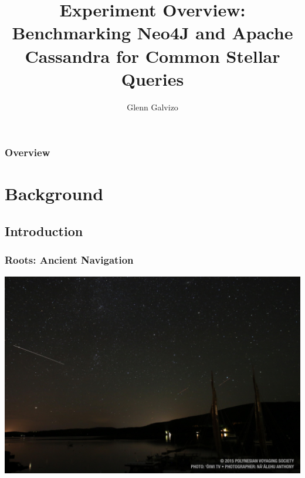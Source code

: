 \documentclass[11pt]{beamer}
\author{Glenn Galvizo}
\title{Experiment Overview: Benchmarking Neo4J and Apache Cassandra for Common Stellar Queries}
\institute{University of Hawaii at Manoa \\ ICS 421}
\begin{document}
    \begin{frame}
        \titlepage
    \end{frame}

    \begin{frame}
        \frametitle{Overview}
        \tableofcontents
    \end{frame}

    \section{Background}\label{sec:background}
    \subsection{Introduction}\label{subsec:introduction}
    \begin{frame}
        \frametitle{Roots: Ancient Navigation}
        \centerline{\includegraphics[scale=0.18]{images/hokulea.jpg}}
    \end{frame}
\end{document}
